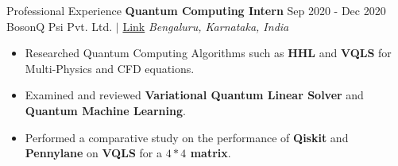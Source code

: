 \documentclass{resume} %
\begin{document}
\begin{rSection}{\Large Professional Experience}
\textbf{Quantum Computing Intern} \hfill Sep 2020 - Dec 2020 \\ 
BosonQ Psi Pvt. Ltd. \hspace{8px} $|$  \hspace{8px} \href{https://www.bosonqpsi.com}{Link} \hfill \textit{Bengaluru, Karnataka, India}
\begin{itemize}
    \item Researched Quantum Computing Algorithms such as \textbf{HHL} and \textbf {VQLS} for Multi-Physics and CFD equations. 
    \item Examined and reviewed \textbf{Variational Quantum Linear Solver} and  \textbf{Quantum Machine Learning}.
    \item Performed a comparative study on the performance of \textbf{Qiskit} and \textbf{Pennylane} on \textbf{VQLS} for a \textbf{$4*4$ matrix}.
\end{itemize}

\end{rSection} 
\vspace{-4px}
\end{document}
